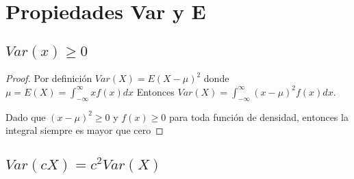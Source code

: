 \documentclass{article}
\begin{document}
\section{Propiedades Var y E}
\subsection{$Var(x) \geq 0$}
\begin{proof}
    Por definición $Var(X) = E(X - \mu)^2$ donde $\mu = E(X) = \int_{-\infty}^{\infty}xf(x)dx$ 
    Entonces $Var(X) = \int_{-\infty}^{\infty}(x-\mu)^2 f(x)dx$.

    Dado que $(x-\mu)^2 \geq 0$ y $f(x) \geq 0$ para toda función de densidad, entonces
    la integral siempre es mayor que cero
\end{proof}
\subsection{$Var(cX) = c^2Var(X)$}
\end{document}
